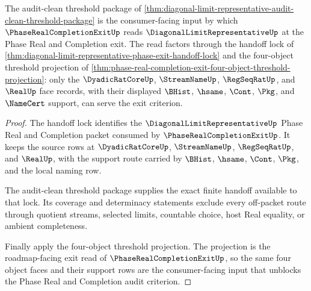 \begin{theorem}
\label{thm:diagonal-limit-representative-phase-exit-audit-unblock}
The audit-clean threshold package of \autoref{thm:diagonal-limit-representative-audit-clean-threshold-package} is the consumer-facing input by which $\PhaseRealCompletionExitUp$ reads $\DiagonalLimitRepresentativeUp$ at the Phase Real and Completion exit. The read factors through the handoff lock of \autoref{thm:diagonal-limit-representative-phase-exit-handoff-lock} and the four-object threshold projection of \autoref{thm:phase-real-completion-exit-four-object-threshold-projection}: only the $\DyadicRatCoreUp$, $\StreamNameUp$, $\RegSeqRatUp$, and $\RealUp$ face records, with their displayed $\BHist$, $\hsame$, $\Cont$, $\Pkg$, and $\NameCert$ support, can serve the exit criterion.
\end{theorem}
\begin{proof}
The handoff lock identifies the $\DiagonalLimitRepresentativeUp$ Phase Real and Completion packet consumed by $\PhaseRealCompletionExitUp$. It keeps the source rows at $\DyadicRatCoreUp$, $\StreamNameUp$, $\RegSeqRatUp$, and $\RealUp$, with the support route carried by $\BHist$, $\hsame$, $\Cont$, $\Pkg$, and the local naming row.

The audit-clean threshold package supplies the exact finite handoff available to that lock. Its coverage and determinacy statements exclude every off-packet route through quotient streams, selected limits, countable choice, host Real equality, or ambient completeness.

Finally apply the four-object threshold projection. The projection is the roadmap-facing exit read of $\PhaseRealCompletionExitUp$, so the same four object faces and their support rows are the consumer-facing input that unblocks the Phase Real and Completion audit criterion.
\end{proof}


